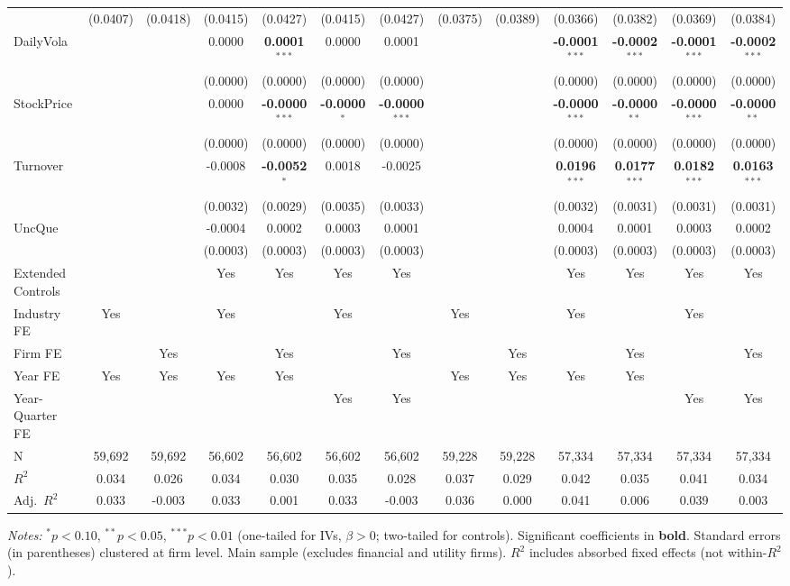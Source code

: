 \begin{landscape}
\begin{table}[H]
\begin{tabular}{lcccccccccccc}
 & (0.0407) & (0.0418) & (0.0415) & (0.0427) & (0.0415) & (0.0427) & (0.0375) & (0.0389) & (0.0366) & (0.0382) & (0.0369) & (0.0384) \\
DailyVola &  &  & 0.0000 & \textbf{0.0001}$^{***}$ & 0.0000 & 0.0001 &  &  & \textbf{-0.0001}$^{***}$ & \textbf{-0.0002}$^{***}$ & \textbf{-0.0001}$^{***}$ & \textbf{-0.0002}$^{***}$ \\
 &  &  & (0.0000) & (0.0000) & (0.0000) & (0.0000) &  &  & (0.0000) & (0.0000) & (0.0000) & (0.0000) \\
StockPrice &  &  & 0.0000 & \textbf{-0.0000}$^{***}$ & \textbf{-0.0000}$^{*}$ & \textbf{-0.0000}$^{***}$ &  &  & \textbf{-0.0000}$^{***}$ & \textbf{-0.0000}$^{**}$ & \textbf{-0.0000}$^{***}$ & \textbf{-0.0000}$^{**}$ \\
 &  &  & (0.0000) & (0.0000) & (0.0000) & (0.0000) &  &  & (0.0000) & (0.0000) & (0.0000) & (0.0000) \\
Turnover &  &  & -0.0008 & \textbf{-0.0052}$^{*}$ & 0.0018 & -0.0025 &  &  & \textbf{0.0196}$^{***}$ & \textbf{0.0177}$^{***}$ & \textbf{0.0182}$^{***}$ & \textbf{0.0163}$^{***}$ \\
 &  &  & (0.0032) & (0.0029) & (0.0035) & (0.0033) &  &  & (0.0032) & (0.0031) & (0.0031) & (0.0031) \\
UncQue &  &  & -0.0004 & 0.0002 & 0.0003 & 0.0001 &  &  & 0.0004 & 0.0001 & 0.0003 & 0.0002 \\
 &  &  & (0.0003) & (0.0003) & (0.0003) & (0.0003) &  &  & (0.0003) & (0.0003) & (0.0003) & (0.0003) \\
\midrule
Extended Controls &  &  & Yes & Yes & Yes & Yes &  &  & Yes & Yes & Yes & Yes \\
Industry FE & Yes &  & Yes &  & Yes &  & Yes &  & Yes &  & Yes &  \\
Firm FE &  & Yes &  & Yes &  & Yes &  & Yes &  & Yes &  & Yes \\
Year FE & Yes & Yes & Yes & Yes &  &  & Yes & Yes & Yes & Yes &  &  \\
Year-Quarter FE &  &  &  &  & Yes & Yes &  &  &  &  & Yes & Yes \\
\midrule
N & 59,692 & 59,692 & 56,602 & 56,602 & 56,602 & 56,602 & 59,228 & 59,228 & 57,334 & 57,334 & 57,334 & 57,334 \\
$R^2$ & 0.034 & 0.026 & 0.034 & 0.030 & 0.035 & 0.028 & 0.037 & 0.029 & 0.042 & 0.035 & 0.041 & 0.034 \\
Adj.~$R^2$ & 0.033 & -0.003 & 0.033 & 0.001 & 0.033 & -0.003 & 0.036 & 0.000 & 0.041 & 0.006 & 0.039 & 0.003 \\
\bottomrule
\end{tabular}
\begin{minipage}{\linewidth}
\vspace{2pt}\scriptsize
\textit{Notes:} $^{*}p<0.10$, $^{**}p<0.05$, $^{***}p<0.01$ (one-tailed for IVs, $\beta > 0$; two-tailed for controls).
 Significant coefficients in \textbf{bold}.
 Standard errors (in parentheses) clustered at firm level.
 Main sample (excludes financial and utility firms).
 $R^2$ includes absorbed fixed effects (not within-$R^2$).
\end{minipage}
\end{table}
\end{landscape}